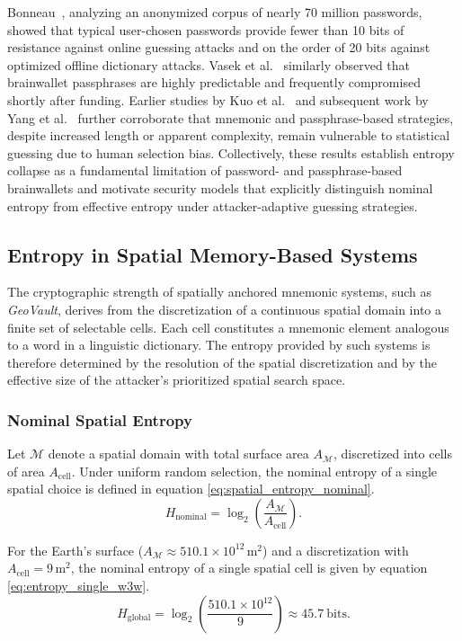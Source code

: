 \documentclass[journal,article,accept,pdftex,moreauthors]{Definitions/mdpi}
\begin{document}
Bonneau~\cite{Bonneau2012}, analyzing an anonymized corpus of nearly 70 million passwords, showed that typical user-chosen passwords provide fewer than 10 bits of resistance against online guessing attacks and on the order of 20 bits against optimized offline dictionary attacks. Vasek et al.~\cite{Vasek2017} similarly observed that brainwallet passphrases are highly predictable and frequently compromised shortly after funding. Earlier studies by Kuo et al.~\cite{Kuo2006} and subsequent work by Yang et al.~\cite{Yang2016} further corroborate that mnemonic and passphrase-based strategies, despite increased length or apparent complexity, remain vulnerable to statistical guessing due to human selection bias. Collectively, these results establish entropy collapse as a fundamental limitation of password- and passphrase-based brainwallets and motivate security models that explicitly distinguish nominal entropy from effective entropy under attacker-adaptive guessing strategies.

\subsection{Entropy in Spatial Memory-Based Systems}

The cryptographic strength of spatially anchored mnemonic systems, such as \textit{GeoVault}, derives from the discretization of a continuous spatial domain into a finite set of selectable cells. Each cell constitutes a mnemonic element analogous to a word in a linguistic dictionary. The entropy provided by such systems is therefore determined by the resolution of the spatial discretization and by the effective size of the attacker’s prioritized spatial search space.

\subsubsection{Nominal Spatial Entropy}

Let $\mathcal{M}$ denote a spatial domain with total surface area $A_{\mathcal{M}}$, discretized into cells of area $A_{\text{cell}}$. Under uniform random selection, the nominal entropy of a single spatial choice is defined in equation \ref{eq:spatial_entropy_nominal}.
\begin{equation}
H_{\text{nominal}} = \log_2\!\left(\frac{A_{\mathcal{M}}}{A_{\text{cell}}}\right).
\label{eq:spatial_entropy_nominal}
\end{equation}

For the Earth’s surface ($A_{\mathcal{M}} \approx 510.1 \times 10^{12}\,\text{m}^2$) and a discretization with $A_{\text{cell}} = 9\,\text{m}^2$, the nominal entropy of a single spatial cell is given by equation \ref{eq:entropy_single_w3w}.
\begin{equation}
H_{\text{global}} = \log_2\!\left(\frac{510.1 \times 10^{12}}{9}\right) \approx 45.7~\text{bits}.
\label{eq:entropy_single_w3w}
\end{equation}
\end{document}
